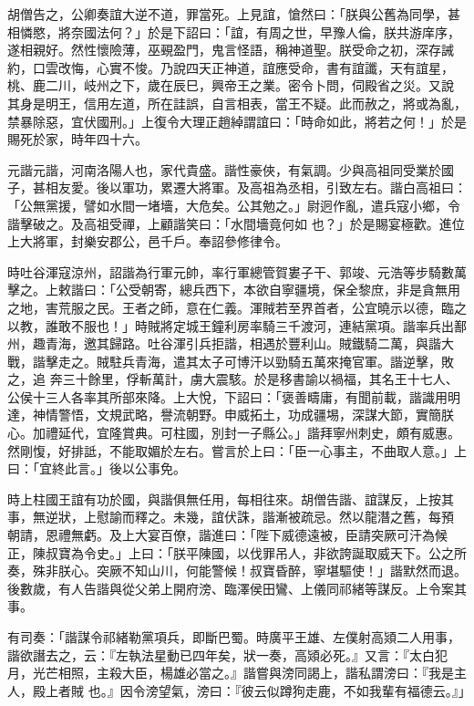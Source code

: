 \begin{pinyinscope}
 胡僧告之，公卿奏誼大逆不道，罪當死。上見誼，愴然曰：「朕與公舊為同學，甚相憐愍，將奈國法何？」於是下詔曰：「誼，有周之世，早豫人倫，朕共游庠序，遂相親好。然性懷險薄，巫覡盈門，鬼言怪語，稱神道聖。朕受命之初，深存誡約，口雲改悔，心實不悛。乃說四天正神道，誼應受命，書有誼讖，天有誼星，桃、鹿二川，岐州之下，歲在辰巳，興帝王之業。密令卜問，伺殿省之災。又說
 其身是明王，信用左道，所在詿誤，自言相表，當王不疑。此而赦之，將或為亂，禁暴除惡，宜伏國刑。」上復令大理正趙綽謂誼曰：「時命如此，將若之何！」於是賜死於家，時年四十六。



 元諧元諧，河南洛陽人也，家代貴盛。諧性豪俠，有氣調。少與高祖同受業於國子，甚相友愛。後以軍功，累遷大將軍。及高祖為丞相，引致左右。諧白高祖曰：「公無黨援，譬如水間一堵墻，大危矣。公其勉之。」尉迥作亂，遣兵寇小鄉，令諧擊破之。及高祖受禪，上顧諧笑曰：「水間墻竟何如
 也？」於是賜宴極歡。進位上大將軍，封樂安郡公，邑千戶。奉詔參修律令。



 時吐谷渾寇涼州，詔諧為行軍元帥，率行軍總管賀婁子干、郭竣、元浩等步騎數萬擊之。上敕諧曰：「公受朝寄，總兵西下，本欲自寧疆境，保全黎庶，非是貪無用之地，害荒服之民。王者之師，意在仁義。渾賊若至界首者，公宜曉示以德，臨之以教，誰敢不服也！」時賊將定城王鐘利房率騎三千渡河，連結黨項。諧率兵出鄯州，趣青海，邀其歸路。吐谷渾引兵拒諧，相遇於豐利山。賊鐵騎二萬，與諧大戰，諧擊走之。賊駐兵青海，遣其太子可博汗以勁騎五萬來掩官軍。諧逆擊，敗之，追
 奔三十餘里，俘斬萬計，虜大震駭。於是移書諭以禍福，其名王十七人、公侯十三人各率其所部來降。上大悅，下詔曰：「褒善疇庸，有聞前載，諧識用明達，神情警悟，文規武略，譽流朝野。申威拓土，功成疆埸，深謀大節，實簡朕心。加禮延代，宜隆賞典。可柱國，別封一子縣公。」諧拜寧州刺史，頗有威惠。然剛愎，好排詆，不能取媚於左右。嘗言於上曰：「臣一心事主，不曲取人意。」上曰：「宜終此言。」後以公事免。



 時上柱國王誼有功於國，與諧俱無任用，每相往來。胡僧告諧、誼謀反，上按其事，無逆狀，上慰諭而釋之。未幾，誼伏誅，諧漸被疏忌。然以龍潛之舊，每預
 朝請，恩禮無虧。及上大宴百僚，諧進曰：「陛下威德遠被，臣請突厥可汗為候正，陳叔寶為令史。」上曰：「朕平陳國，以伐罪吊人，非欲誇誕取威天下。公之所奏，殊非朕心。突厥不知山川，何能警候！叔寶昏醉，寧堪驅使！」諧默然而退。後數歲，有人告諧與從父弟上開府滂、臨澤侯田鸞、上儀同祁緒等謀反。上令案其事。



 有司奏：「諧謀令祁緒勒黨項兵，即斷巴蜀。時廣平王雄、左僕射高熲二人用事，諧欲譖去之，云：『左執法星動已四年矣，狀一奏，高熲必死。』又言：『太白犯月，光芒相照，主殺大臣，楊雄必當之。』諧嘗與滂同謁上，諧私謂滂曰：『我是主人，殿上者賊
 也。』因令滂望氣，滂曰：『彼云似蹲狗走鹿，不如我輩有福德云。』」




\end{pinyinscope}
